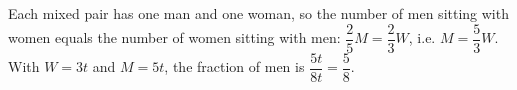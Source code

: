 Each mixed pair has one man and one woman, so the number of men sitting with women equals the number of women sitting with men: $\dfrac25M=\dfrac23W$, i.e. $M=\dfrac53W$. With $W=3t$ and $M=5t$, the fraction of men is $\dfrac{5t}{8t}=\boxed{\dfrac58}$.
